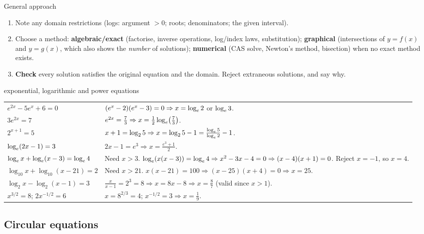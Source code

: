 \begin{method}{General approach}
\begin{enumerate}
  \item Note any domain restrictions (logs: argument $>0$; roots; denominators; the given interval).
  \item Choose a method: \textbf{algebraic/exact} (factorise, inverse operations, log/index laws, substitution); \textbf{graphical} (intersections of $y=f(x)$ and $y=g(x)$, which also shows the \emph{number} of solutions); \textbf{numerical} (CAS solve, Newton's method, bisection) when no exact method exists.
  \item \textbf{Check} every solution satisfies the original equation and the domain. Reject extraneous solutions, and say why.
\end{enumerate}
\end{method}

\begin{example}{exponential, logarithmic and power equations \byhand}
\begin{tabularx}{\linewidth}{@{}p{5.1cm}L@{}}
$e^{2x}-5e^x+6=0$ & $(e^x-2)(e^x-3)=0\Rightarrow x=\log_e2$ or $\log_e3$. \\
$3e^{2x}=7$ & $e^{2x}=\frac73\Rightarrow x=\frac12\log_e\!\left(\frac73\right)$. \\
$2^{x+1}=5$ & $x+1=\log_25\Rightarrow x=\log_25-1=\frac{\log_e5}{\log_e2}-1$. \\
$\log_e(2x-1)=3$ & $2x-1=e^3\Rightarrow x=\frac{e^3+1}{2}$. \\
$\log_e x+\log_e(x-3)=\log_e4$ & Need $x>3$. $\log_e(x(x-3))=\log_e4\Rightarrow x^2-3x-4=0\Rightarrow(x-4)(x+1)=0$. Reject $x=-1$, so $x=4$. \\
$\log_{10}x+\log_{10}(x-21)=2$ & Need $x>21$. $x(x-21)=100\Rightarrow(x-25)(x+4)=0\Rightarrow x=25$. \\
$\log_2x-\log_2(x-1)=3$ & $\frac{x}{x-1}=2^3=8\Rightarrow x=8x-8\Rightarrow x=\frac87$ (valid since $x>1$). \\
$x^{3/2}=8$; \quad $2x^{-1/2}=6$ & $x=8^{2/3}=4$; \quad $x^{-1/2}=3\Rightarrow x=\frac19$. \\
\end{tabularx}
\end{example}

\subsection{Circular equations}
\label{sec:circeq}

